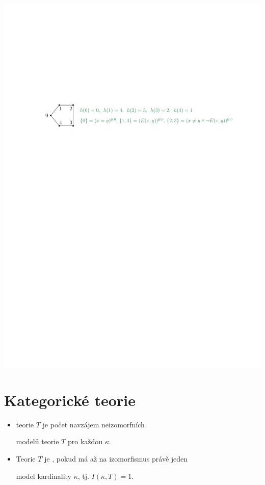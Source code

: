     \centerline{\includegraphics[scale=0.75]{files/5cyklus}}
    \smallskip
    
    
    \vspace{-6mm}
    
    

\section{Kategorické teorie}\label{section:categoricity}
\todo

\begin{itemize}
    \item {} teorie $T$ je počet  navzájem neizomorfních
    \smallskip
    
    modelů teorie $T$ pro každou  $\kappa$.
        \smallskip
    
    \item Teorie $T$ je , pokud má až na izomorfismus právě jeden
    \smallskip
    
    model kardinality $\kappa$, tj. $I(\kappa,T)=1$.
    \end{itemize}
    \medskip
    
